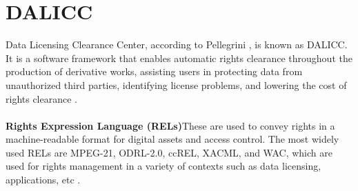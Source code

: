 \chapter{DALICC}
Data Licensing Clearance Center, according to Pellegrini \cite{Tassilo}, is known as DALICC. It is a software framework that enables automatic rights clearance throughout the production of derivative works, assisting users in protecting data from unauthorized third parties, identifying license problems, and lowering the cost of rights clearance \cite{Tassilo}. \\
\\
\textbf{Rights Expression Language (RELs)}These are used to convey rights in a machine-readable format for digital assets and access control. The most widely used RELs are MPEG-21, ODRL-2.0, ccREL, XACML, and WAC, which are used for rights management in a variety of contexts such as data licensing, applications, etc \cite{Anna}.\\
\\
